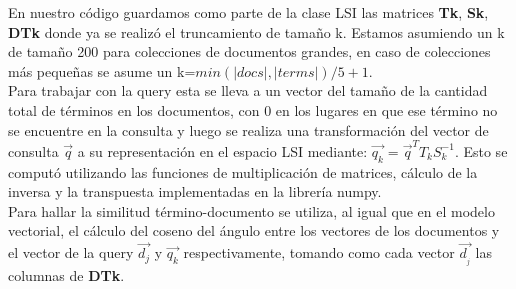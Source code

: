 \documentclass[spanish]{article}
\begin{document}
En nuestro código guardamos como parte de la clase LSI las matrices  \textbf{Tk}, \textbf{Sk}, \textbf{DTk} donde ya se realizó el truncamiento de tamaño k. Estamos asumiendo un k de tamaño 200 para colecciones de documentos grandes, en caso de colecciones más pequeñas se asume un k=$min(|docs|,|terms|)/5+1$. \\

Para trabajar con la query esta se lleva a un vector del tamaño de la cantidad total de términos en los documentos, con 0 en los lugares en que ese término no se encuentre en la consulta y luego se realiza una transformación del vector de consulta $\vec{q}$ a su representación en el espacio LSI mediante: $\vec{q_{k}}=\vec{q}^{T}T_{k}S_{k}^{-1}$. Esto se computó utilizando las funciones de multiplicación de matrices, cálculo de la inversa y la transpuesta implementadas en la librería numpy. \\

Para hallar la similitud término-documento se utiliza, al igual que en el modelo vectorial, el cálculo del coseno del ángulo entre los vectores de los documentos y el vector de la query $\vec{d_{j}}$ y $\vec{q_{k}}$ respectivamente, tomando como cada vector $\vec{d_{_{j}}}$ las columnas de \textbf{DTk}.
\end{document}
